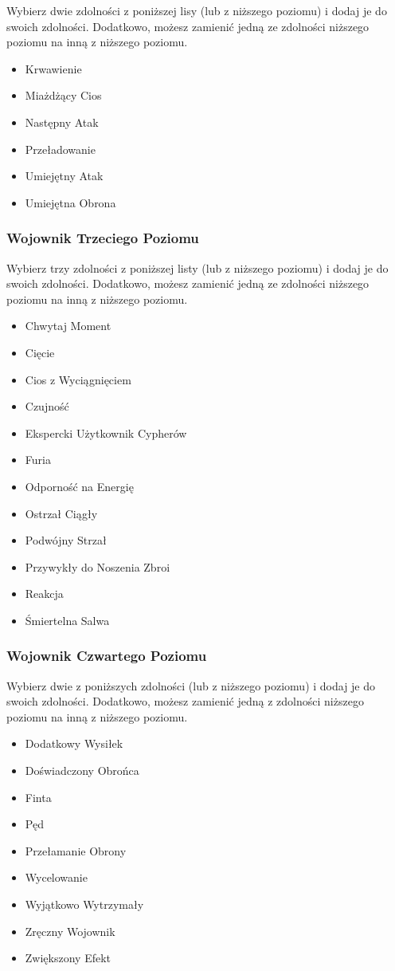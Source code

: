 Wybierz dwie zdolności z poniższej lisy (lub z niższego poziomu) i dodaj je do swoich zdolności. Dodatkowo, możesz zamienić jedną ze zdolności niższego poziomu na inną z niższego poziomu.

\begin{itemize}
\item Krwawienie
\item Miażdżący Cios
\item Następny Atak
\item Przeładowanie
\item Umiejętny Atak
\item Umiejętna Obrona
\end{itemize}

\subsubsection{Wojownik Trzeciego Poziomu}

Wybierz trzy zdolności z poniższej listy (lub z niższego poziomu) i dodaj je do swoich zdolności. Dodatkowo, możesz zamienić jedną ze zdolności niższego poziomu na inną z niższego poziomu.

\begin{itemize}
\item Chwytaj Moment
\item Cięcie
\item Cios z Wyciągnięciem
\item Czujność
\item Ekspercki Użytkownik Cypherów
\item Furia
\item Odporność na Energię
\item Ostrzał Ciągły
\item Podwójny Strzał
\item Przywykły do Noszenia Zbroi
\item Reakcja
\item Śmiertelna Salwa
\end{itemize}

\subsubsection{Wojownik Czwartego Poziomu}

Wybierz dwie z poniższych zdolności (lub z niższego poziomu) i dodaj je do swoich zdolności. Dodatkowo, możesz zamienić jedną z zdolności niższego poziomu na inną z niższego poziomu.

\begin{itemize}
\item Dodatkowy Wysiłek
\item Doświadczony Obrońca
\item Finta
\item Pęd
\item Przełamanie Obrony
\item Wycelowanie
\item Wyjątkowo Wytrzymały
\item Zręczny Wojownik
\item Zwiększony Efekt
\end{itemize}

